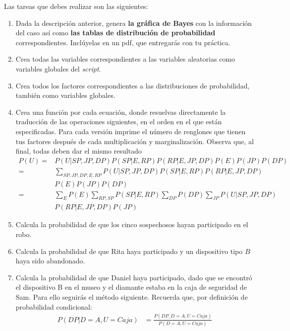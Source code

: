 Las tareas que debes realizar son las siguientes:
\begin{enumerate}
 \item Dada la descripción anterior, genera \textbf{la gráfica de Bayes} con la información del caso así como \textbf{las tablas de distribución de probabilidad} correspondientes.  Inclúyelas en un pdf, que entregarás con tu práctica.

 \item Crea todas las variables correspondientes a las variables aleatorias como variables globales del \textit{script}.
 
 \item Crea todos los factores correspondientes a las distribuciones de probabilidad, también como variables globales.
 
 \item Crea una función por cada ecuación, donde resuelvas directamente la traducción de las operaciones siguientes, en el orden en el que están especificadas.  Para cada versión imprime el número de renglones que tienen tus factores después de cada multiplicación y marginalización. Observa que, al final, todas deben dar el mismo resultado
 \begin{align}
  P(U) =& P(U|SP,JP,DP)P(SP|E,RP)P(RP|E,JP,DP)P(E)P(JP)P(DP) \\
       =& \sum_{SP,JP,DP,E,RP}P(U|SP,JP,DP)P(SP|E,RP)P(RP|E,JP,DP) \nonumber \\
        & P(E)P(JP)P(DP) \nonumber \\
       =& \sum_{E}P(E) \sum_{RP,SP}P(SP|E,RP) \sum_{DP}P(DP) \sum_{JP}P(U|SP,JP,DP) \nonumber \\
        & P(RP|E,JP,DP)P(JP) \nonumber
 \end{align}
 
 \item Calcula la probabilidad de que los cinco sospechosos hayan participado en el robo.

 \item Calcula la probabilidad de que Rita haya participado y un dispositivo tipo $B$ haya sido abandonado.
 
 \item Calcula la probabilidad de que Daniel haya participado, dado que se encontró el dispositivo B en el museo y el diamante estaba en la caja de seguridad de Sam.  Para ello seguirás el método siguiente.
 Recuerda que, por definición de probabilidad condicional:
 \begin{align*}
   P(DP|D=A,U=Caja) &= \frac{P(DP,D=A,U=Caja)}{P(D=A,U=Caja)}
 \end{align*}
  

\end{enumerate}
